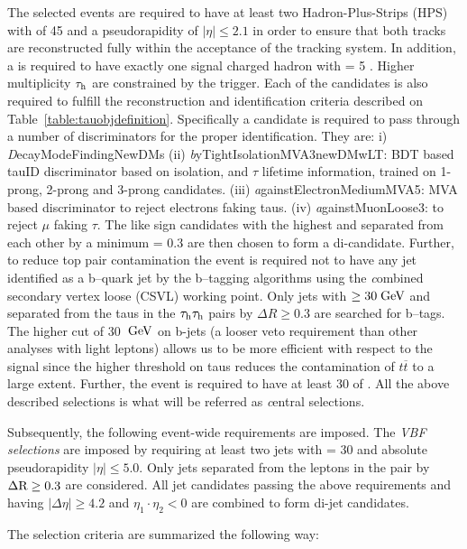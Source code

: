 The selected events are required to have at least two Hadron-Plus-Strips (HPS) \hadtau with \pt of 45 \gev and a pseudorapidity of $|\eta| \le 2.1$ in order to ensure that both tracks are reconstructed fully within the acceptance of the tracking system. In addition, a \hadtau is required to have exactly one signal charged hadron with \pt = 5 \gev. Higher multiplicity $\tau_{\text{h}}$ are constrained by the trigger. Each of the \hadtau candidates is also required to fulfill the reconstruction and identification criteria described on Table~\ref{table:tauobjdefinition}. Specifically a \hadtau candidate is required to pass through a number of discriminators for the proper identification. They are:
i) {\textit DecayModeFindingNewDMs} (ii) {\textit byTightIsolationMVA3newDMwLT}: BDT based tauID discriminator based on isolation, \pt and $\tau$ lifetime information, trained on 1-prong, 2-prong and 3-prong \hadtau candidates. (iii) {\textit againstElectronMediumMVA5}: MVA based discriminator to reject electrons faking taus. (iv) {\textit againstMuonLoose3}: to reject $\mu$ faking $\tau$. The like sign \hadtau candidates with the highest \pt and separated from each other by a minimum \deltar = 0.3 are then chosen to form a di-\hadtau candidate. 
Further, to reduce top pair contamination the event is required not to have any jet identified as a b--quark jet by the b--tagging algorithms using the {\textit combined secondary vertex loose} (CSVL) working point. Only jets with \pt $\ge 30 \;\text{Ge}\kern-0.06667em\text{V}$ and separated from the taus in the $\tau_{\text{h}}\tau_{\text{h}}$ pairs by $\Delta R \ge 0.3$ are searched for b--tags. The higher \pt cut of 30 $\;\text{Ge}\kern-0.06667em\text{V}$ on b-jets (a looser veto requirement than other analyses with light leptons) allows us to be more efficient with respect to the signal since the higher \pt threshold on taus reduces the contamination of $t\overline{t}$ to a large extent. Further, the event is required to have at least 30 \gev of \met. All the above described selections is what will be referred as {\textit central selections}.

Subsequently, the following event-wide requirements are imposed. The {\textit {VBF selections}} are imposed by requiring at least two jets with \pt = 30 \gev and absolute pseudorapidity $|\eta| \le 5.0$. Only jets separated from the leptons in the \hadtau\hadtau pair by $\Delta \text{R} \ge 0.3$ are considered. All jet candidates passing the above requirements and having $\vert \Delta\eta \vert \ge 4.2$ and $\eta_{1}\cdot\eta_{2} < 0$ are combined to form di-jet candidates.

The selection criteria are summarized the following way:

